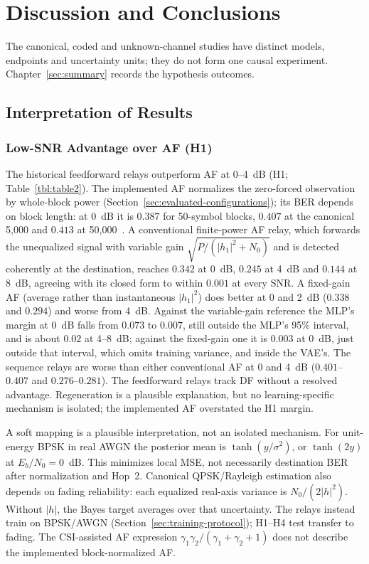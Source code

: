 \chapter{Discussion and Conclusions}\label{sec:discussion-and-conclusions}

The canonical, coded and unknown-channel studies have distinct models, endpoints and uncertainty units; they do not form one causal experiment. Chapter~\ref{sec:summary} records the hypothesis outcomes.

\section{Interpretation of Results}\label{sec:interpretation-of-results}

\subsection{Low-SNR Advantage over AF (H1)}\label{sec:low-snr-advantage-of-neural-relays-h1-confirmed}

The historical feedforward relays outperform AF at 0--4~dB (H1; Table~\ref{tbl:table2}). The implemented AF normalizes the zero-forced observation by whole-block power (Section~\ref{sec:evaluated-configurations}); its BER depends on block length: at 0~dB it is $0.387$ for 50-symbol blocks, $0.407$ at the canonical 5{,}000 and $0.413$ at 50{,}000~. A conventional finite-power AF relay, which forwards the unequalized signal with variable gain $\sqrt{P/(|h_1|^{2}+N_0)}$ and is detected coherently at the destination, reaches $0.342$ at 0~dB, $0.245$ at 4~dB and $0.144$ at 8~dB, agreeing with its closed form to within $0.001$ at every SNR. A fixed-gain AF (average rather than instantaneous $|h_1|^2$) does better at 0 and 2~dB ($0.338$ and $0.294$) and worse from 4~dB. Against the variable-gain reference the MLP's margin at 0~dB falls from $0.073$ to $0.007$, still outside the MLP's 95\% interval, and is about $0.02$ at 4--8~dB; against the fixed-gain one it is $0.003$ at 0~dB, just outside that interval, which omits training variance, and inside the VAE's. The sequence relays are worse than either conventional AF at 0 and 4~dB ($0.401$--$0.407$ and $0.276$--$0.281$). The feedforward relays track DF without a resolved advantage. Regeneration is a plausible explanation, but no learning-specific mechanism is isolated; the implemented AF overstated the H1 margin.

A soft mapping is a plausible interpretation, not an isolated mechanism. For unit-energy BPSK in real AWGN the posterior mean is $\tanh(y/\sigma^2)$, or $\tanh(2y)$ at $E_b/N_0=0$~dB. This minimizes local MSE, not necessarily destination BER after normalization and Hop~2. Canonical QPSK/Rayleigh estimation also depends on fading reliability: each equalized real-axis variance is $N_0/(2|h|^2)$. Without $|h|$, the Bayes target averages over that uncertainty. The relays instead train on BPSK/AWGN (Section~\ref{sec:training-protocol}); H1--H4 test transfer to fading. The CSI-assisted AF expression $\gamma_1\gamma_2/(\gamma_1+\gamma_2+1)$ does not describe the implemented block-normalized AF.

